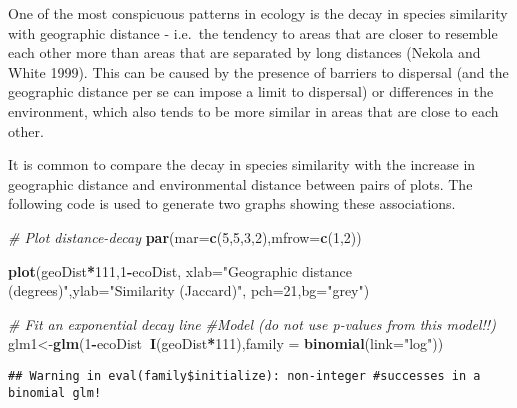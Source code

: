 \documentclass[]{article}
\newenvironment{Shaded}{\begin{snugshade}}{\end{snugshade}}
\newcommand{\CommentTok}[1]{\textcolor[rgb]{0.56,0.35,0.01}{\textit{#1}}}
\newcommand{\DataTypeTok}[1]{\textcolor[rgb]{0.13,0.29,0.53}{#1}}
\newcommand{\DecValTok}[1]{\textcolor[rgb]{0.00,0.00,0.81}{#1}}
\newcommand{\KeywordTok}[1]{\textcolor[rgb]{0.13,0.29,0.53}{\textbf{#1}}}
\newcommand{\NormalTok}[1]{#1}
\newcommand{\OperatorTok}[1]{\textcolor[rgb]{0.81,0.36,0.00}{\textbf{#1}}}
\newcommand{\StringTok}[1]{\textcolor[rgb]{0.31,0.60,0.02}{#1}}
\begin{document}
One of the most conspicuous patterns in ecology is the decay in species
similarity with geographic distance - i.e.~the tendency to areas that
are closer to resemble each other more than areas that are separated by
long distances (Nekola and White 1999). This can be caused by the
presence of barriers to dispersal (and the geographic distance per se
can impose a limit to dispersal) or differences in the environment,
which also tends to be more similar in areas that are close to each
other.

It is common to compare the decay in species similarity with the
increase in geographic distance and environmental distance between pairs
of plots. The following code is used to generate two graphs showing
these associations.

\begin{Shaded}
\begin{Highlighting}[]
\CommentTok{# Plot distance-decay}
\KeywordTok{par}\NormalTok{(}\DataTypeTok{mar=}\KeywordTok{c}\NormalTok{(}\DecValTok{5}\NormalTok{,}\DecValTok{5}\NormalTok{,}\DecValTok{3}\NormalTok{,}\DecValTok{2}\NormalTok{),}\DataTypeTok{mfrow=}\KeywordTok{c}\NormalTok{(}\DecValTok{1}\NormalTok{,}\DecValTok{2}\NormalTok{))}

\KeywordTok{plot}\NormalTok{(geoDist}\OperatorTok{*}\DecValTok{111}\NormalTok{,}\DecValTok{1}\OperatorTok{-}\NormalTok{ecoDist,}
     \DataTypeTok{xlab=}\StringTok{"Geographic distance (degrees)"}\NormalTok{,}\DataTypeTok{ylab=}\StringTok{"Similarity (Jaccard)"}\NormalTok{,}
     \DataTypeTok{pch=}\DecValTok{21}\NormalTok{,}\DataTypeTok{bg=}\StringTok{"grey"}\NormalTok{)}

\CommentTok{# Fit an exponential decay line}
\CommentTok{#Model (do not use p-values from this model!!)}
\NormalTok{glm1<-}\KeywordTok{glm}\NormalTok{(}\DecValTok{1}\OperatorTok{-}\NormalTok{ecoDist}\OperatorTok{~}\KeywordTok{I}\NormalTok{(geoDist}\OperatorTok{*}\DecValTok{111}\NormalTok{),}\DataTypeTok{family =} \KeywordTok{binomial}\NormalTok{(}\DataTypeTok{link=}\StringTok{"log"}\NormalTok{))}
\end{Highlighting}
\end{Shaded}

\begin{verbatim}
## Warning in eval(family$initialize): non-integer #successes in a binomial glm!
\end{verbatim}
\end{document}
